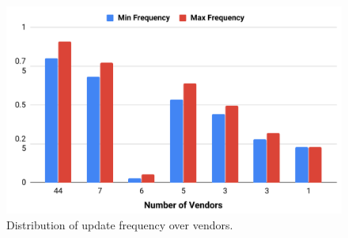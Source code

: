 \begin{figure}
\centering
\includegraphics[width=0.7\linewidth]{figure/frequency}
\caption{Distribution of update frequency over vendors.}
\label{fig:frequency}
\end{figure}